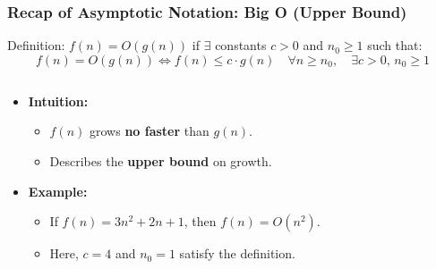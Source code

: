 
\begin{frame}
  \frametitle{Recap of Asymptotic Notation: Big O (Upper Bound)}

  \begin{block}{Definition:} $f(n) = O(g(n))$ if $\exists$ constants $c > 0$ and $n_0 \geq 1$ such that:
\[
f(n) = O(g(n)) \iff  f(n) \leq c \cdot g(n) \quad \forall n \geq n_0, \quad \exists c > 0, \, n_0 \geq 1
\]
        \end{block}
          \begin{columns}

    \begin{column}{0.7\textwidth}
      \begin{itemize}
        \item \textbf{Intuition:}
        \begin{itemize}
            \item \( f(n) \) grows \textbf{no faster} than \( g(n) \).
            \vspace{3pt}
            \item Describes the \textbf{upper bound} on growth.
        \end{itemize}
        
        \item \textbf{Example:}
        \begin{itemize}
            \item If \( f(n) = 3n^2 + 2n + 1 \), then \( f(n) = O(n^2) \).
            \vspace{3pt}
            \item Here, \( c = 4 \) and \( n_0 = 1 \) satisfy the definition.
        \end{itemize}
      \end{itemize}
    \end{column}


\end{columns}
\end{frame}
